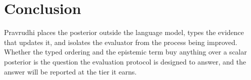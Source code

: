 \section{Conclusion}
\label{sec:conclusion}

Pravrudhi places the posterior outside the language model, types the evidence that updates it, and isolates the evaluator from the process being improved. Whether the typed ordering and the epistemic term buy anything over a scalar posterior is the question the evaluation protocol is designed to answer, and the answer will be reported at the tier it earns.
